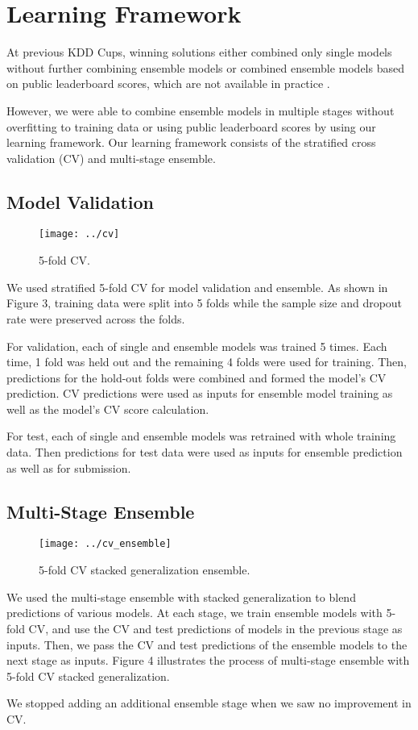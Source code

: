 \section{Learning Framework}
At previous KDD Cups, winning solutions either combined only single models without further combining ensemble models \cite{guyon2009analysis, yu2010feature, jahrer2012ensemble} or combined ensemble models based on public leaderboard scores, which are not available in practice \cite{chen2011, wu2012two}.

However, we were able to combine ensemble models in multiple stages without overfitting to training data or using public leaderboard scores by using our learning framework.  Our learning framework consists of the stratified cross validation (CV) and multi-stage ensemble.

\subsection{Model Validation}

\begin{figure}
  \centering
    \texttt{[image: ../cv]}
    \caption{5-fold CV.}
\end{figure}

We used stratified 5-fold CV for model validation and ensemble.
As shown in Figure 3, training data were split into 5 folds while the sample size and dropout rate were preserved across the folds.

For validation, each of single and ensemble models was trained 5 times. Each time, 1 fold was held out and the remaining 4 folds were used for training. Then, predictions for the hold-out folds were combined and formed the model's CV prediction. CV predictions were used as inputs for ensemble model training as well as the model's CV score calculation.

For test, each of single and ensemble models was retrained with whole training data. Then predictions for test data were used as inputs for ensemble prediction as well as for submission. 

\subsection{Multi-Stage Ensemble}

\begin{figure}[!h]
  \centering
    \texttt{[image: ../cv\_ensemble]}
      \caption{5-fold CV stacked generalization ensemble.}
\end{figure}

We used the multi-stage ensemble with stacked generalization \cite{wolpert1992stacked} to blend predictions of various models.  At each stage, we train ensemble models with 5-fold CV, and use the CV and test predictions of models in the previous stage as inputs.  Then, we pass the CV and test predictions of the ensemble models to the next stage as inputs.  Figure 4 illustrates the process of multi-stage ensemble with 5-fold CV stacked generalization.

We stopped adding an additional ensemble stage when we saw no improvement in CV.